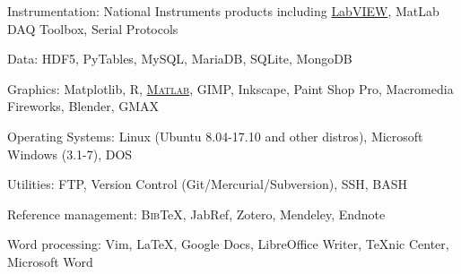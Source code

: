 \documentclass[10pt]{article}
\newcommand{\blankline}{\quad\pagebreak[2]}
\begin{document}
\blankline

Instrumentation: National Instruments products including
\href{http://www.ni.com/}{LabVIEW}, MatLab DAQ Toolbox, Serial Protocols

\blankline

Data: HDF5, PyTables, MySQL, MariaDB, SQLite, MongoDB

\blankline

Graphics: Matplotlib, R,
\href{http://www.mathworks.com/products/matlab/}{\textsc{Matlab}}, GIMP,
Inkscape, Paint Shop Pro, Macromedia Fireworks, Blender, GMAX

\blankline

Operating Systems: Linux (Ubuntu 8.04-17.10 and other distros), Microsoft
Windows (3.1-7), DOS

\blankline

Utilities: FTP, Version Control (Git/Mercurial/Subversion), SSH, BASH

\blankline

Reference management: B\textsc{ib}\TeX{}, JabRef, Zotero, Mendeley, Endnote

\blankline

Word processing: Vim, \LaTeX{}, Google Docs, LibreOffice Writer, TeXnic Center,
Microsoft Word
\end{document}

